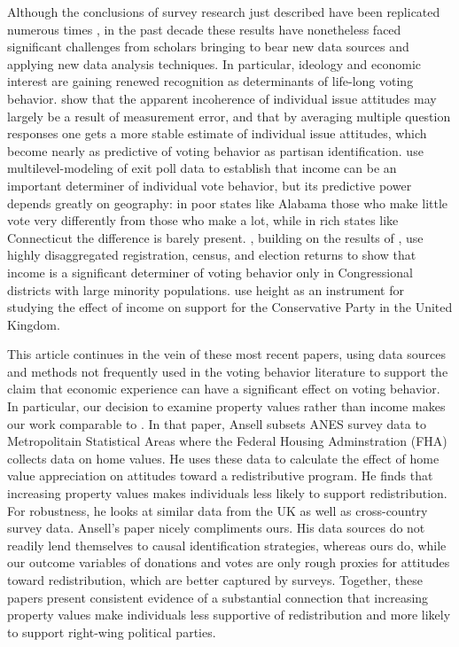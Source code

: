 Although the conclusions of survey research just described have been replicated numerous times \parencite{Nie1976,Smith989,LewisBeck2008}, in the past decade these results have nonetheless faced significant challenges from scholars bringing to bear new data sources and applying new data analysis techniques. In particular, ideology and economic interest are gaining renewed recognition as determinants of life-long voting behavior. \textcite{Ansolabehere2008} show that the apparent incoherence of individual issue attitudes may largely be a result of measurement error, and that by averaging multiple question responses one gets a more stable estimate of individual issue attitudes, which become nearly as predictive of voting behavior as partisan identification.  \textcite{Gelman2007} use multilevel-modeling of exit poll data to establish that income can be an important determiner of individual vote behavior, but its predictive power depends greatly on geography: in poor states like Alabama those who make little vote very differently from those who make a lot, while in rich states like Connecticut the difference is barely present. \textcite{Hersh2015}, building on the results of \textcite{Gelman2007}, use highly disaggregated registration, census, and election returns to show that income is a significant determiner of voting behavior only in Congressional districts with large minority populations. \citeauthor{Arunchalam} use height as an instrument for studying the effect of income on support for the Conservative Party in the United Kingdom. 

This article continues in the vein of these most recent papers, using data sources and methods not frequently used in the voting behavior literature to support the claim that economic experience can have a significant effect on voting behavior. In particular, our decision to examine property values rather than income makes our work comparable to \textcite{Ansell2014}. In that paper, Ansell subsets ANES survey data to Metropolitain Statistical Areas where the Federal Housing Adminstration (FHA) collects data on home values. He uses these data to calculate the effect of home value appreciation on attitudes toward a redistributive program. He finds that increasing property values makes individuals less likely to support redistribution. For robustness, he looks at similar data from the UK as well as cross-country survey data. Ansell's paper nicely compliments ours. His data sources do not readily lend themselves to causal identification strategies, whereas ours do, while our outcome variables of donations and votes are only rough proxies for attitudes toward redistribution, which are better captured by surveys. Together, these papers present consistent evidence of a substantial connection that increasing property values make individuals less supportive of redistribution and more likely to support right-wing political parties. 


